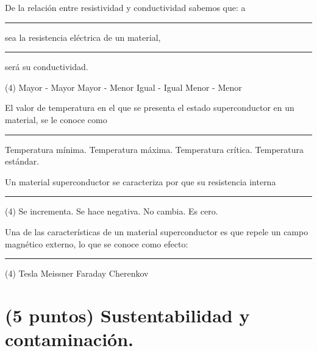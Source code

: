 \documentclass[12pt, letter]{exam}
\begin{document}
\begin{questions}
    \question De la relación entre resistividad y conductividad sabemos que: a \rule{2cm}{0.1mm} sea la resistencia eléctrica de un material, \rule{2cm}{0.1mm} será su conductividad.
    \begin{tasks}(4)
        \task Mayor - Mayor
        \task Mayor - Menor
        \task Igual - Igual
        \task Menor - Menor
    \end{tasks}
    \question El valor de temperatura en el que se presenta el estado superconductor en un material, se le conoce como \rule{2cm}{0.1mm}
    \begin{multicols}{2}
    \begin{tasks}
        \task Temperatura mínima.
        \task Temperatura máxima.
        \task Temperatura crítica.
        \task Temperatura estándar.
    \end{tasks}
    \end{multicols}
    \question Un material superconductor se caracteriza por que su resistencia interna \rule{2cm}{0.1mm}
    \begin{tasks}(4)
        \task Se incrementa.
        \task Se hace negativa.
        \task No cambia.
        \task Es cero.
    \end{tasks}
    \question Una de las características de un material superconductor es que repele un campo magnético externo, lo que se conoce como efecto: \rule{2cm}{0.1mm}
    \begin{tasks}(4)
        \task Tesla
        \task Meissner
        \task Faraday
        \task Cherenkov
    \end{tasks}

    \section{(5 puntos) Sustentabilidad y contaminación.}


\end{questions}
\end{document}

